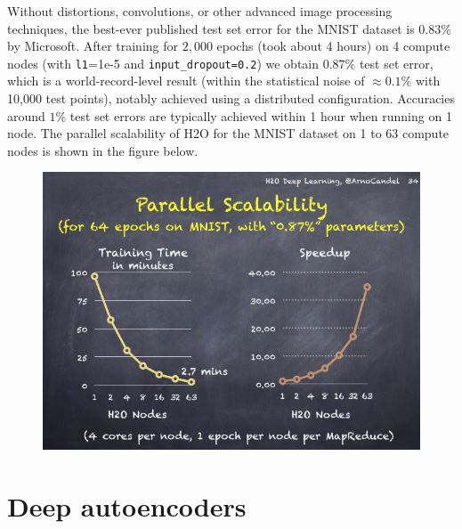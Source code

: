 \documentclass[11pt]{article}
\begin{document}
Without distortions, convolutions, or other advanced image processing techniques, the best-ever published test set error for the MNIST dataset is $0.83$\% by Microsoft. After training for $2,000$ epochs (took about 4 hours) on 4 compute nodes (with \texttt{l1}=1e-5 and \texttt{input\_dropout=0.2}) we obtain $0.87\%$ test set error, which is a world-record-level result (within the statistical noise of $\approx 0.1$\% with 10,000 test points), notably achieved using a distributed configuration. Accuracies around $1\%$ test set errors are typically achieved within 1 hour when running on 1 node.
The parallel scalability of H2O for the MNIST dataset on 1 to 63 compute nodes is shown in the figure below.
\begin{figure}[h!]
\centering
\includegraphics[scale=0.5]{scalability.png}
\end{figure}
\bigskip
\bigskip
\bigskip
\section{Deep autoencoders} \label{4}
\end{document}

